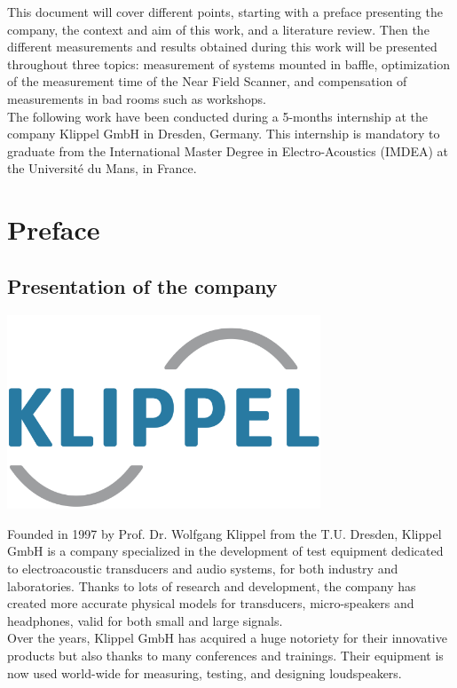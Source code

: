 \documentclass{report}
\begin{document}
This document will cover different points, starting with a preface presenting the company, the context and aim of this work, and a literature review. Then the different measurements and results obtained during this work will be presented throughout three topics: measurement of systems mounted in baffle, optimization of the measurement time of the Near Field Scanner, and compensation of measurements in bad rooms such as workshops. \\

The following work have been conducted during a 5-months internship at the company Klippel GmbH in Dresden, Germany. This internship is mandatory to graduate from the International Master Degree in Electro-Acoustics (IMDEA) at the Université du Mans, in France. \\

\chapter{Preface}

    
\section{Presentation of the company}

\begin{minipage}{0.35\textwidth}
\centering
	\includegraphics[width=0.7\textwidth]{Preface/logo_klippel} 
    \captionsetup{hypcap=false} 
	\label{fig:lolo_klippel}
\end{minipage}
\begin{minipage}{0.65\textwidth}
Founded in 1997 by Prof. Dr. Wolfgang Klippel from the T.U. Dresden, Klippel GmbH is a company specialized in the development of test equipment dedicated to electroacoustic transducers and audio systems, for both industry and laboratories. Thanks to lots of research and development, the company has created more accurate physical models for transducers, micro-speakers and headphones, valid for both small and large signals.  \\
Over the years, Klippel GmbH has acquired a huge notoriety for their innovative products but also thanks to many conferences and trainings. Their equipment is now used world-wide for measuring, testing, and designing loudspeakers.
\end{minipage}
\end{document}
